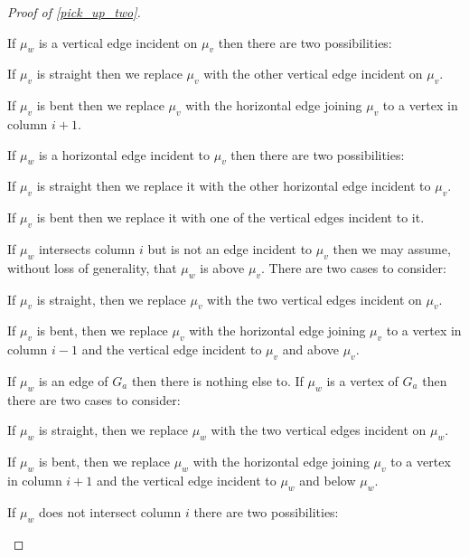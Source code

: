 \documentclass{patmorin}
\begin{document}
\begin{proof}[Proof of \cref{pick_up_two}]
  \begin{compactenum}
    \item If $\mu_w$ is a vertical edge incident on $\mu_v$ then there are two possibilities:
    \begin{compactitem}
      \item If $\mu_v$ is straight then we replace $\mu_v$ with the other vertical edge incident on $\mu_v$.
      \item If $\mu_v$ is bent then we replace $\mu_v$ with the horizontal edge joining $\mu_v$ to a vertex in column $i+1$.
    \end{compactitem}
    \item If  $\mu_w$ is a horizontal edge incident to $\mu_v$ then there are two possibilities:
    \begin{compactitem}
      \item If $\mu_v$ is straight then we replace it with the other horizontal edge incident to $\mu_v$.
      \item If $\mu_v$ is bent then we replace it with one of the vertical edges incident to it.
    \end{compactitem}
    \item If $\mu_w$ intersects column $i$ but is not an edge incident to $\mu_v$ then we may assume, without loss of generality, that $\mu_w$ is above $\mu_v$.  There are two cases to consider:
    \begin{compactitem}
      \item If $\mu_v$ is straight, then we replace $\mu_v$ with the two vertical edges incident on $\mu_v$.
      \item If $\mu_v$ is bent, then we replace $\mu_v$ with the horizontal edge joining $\mu_v$ to a vertex in column $i-1$ and the vertical edge incident to $\mu_v$ and above $\mu_v$.
    \end{compactitem}
    If $\mu_w$ is an edge of $G_a$ then there is nothing else to. If $\mu_w$ is a vertex of $G_a$ then there are two cases to consider:
    \begin{compactitem}
      \item If $\mu_w$ is straight, then we replace $\mu_w$ with the two vertical edges incident on $\mu_w$.
      \item If $\mu_w$ is bent, then we replace $\mu_w$ with the horizontal edge joining $\mu_v$ to a vertex in column $i+1$ and the vertical edge incident to $\mu_w$ and below $\mu_w$.
    \end{compactitem}
    \item If $\mu_w$ does not intersect column $i$ there are two possibilities:

\end{compactenum}
\end{proof}
\end{document}
